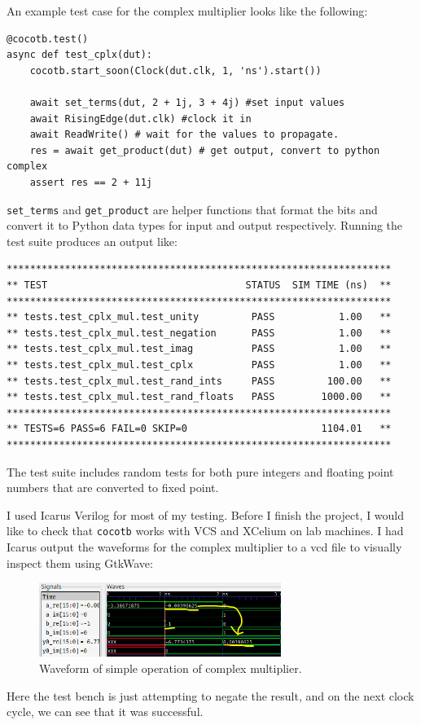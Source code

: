 \documentclass[12pt]{article}
\begin{document}
An example test case for the complex multiplier looks like the following:

\begin{verbatim}
@cocotb.test()
async def test_cplx(dut):
    cocotb.start_soon(Clock(dut.clk, 1, 'ns').start())

    await set_terms(dut, 2 + 1j, 3 + 4j) #set input values
    await RisingEdge(dut.clk) #clock it in
    await ReadWrite() # wait for the values to propagate.
    res = await get_product(dut) # get output, convert to python complex
    assert res == 2 + 11j

\end{verbatim}

\texttt{set\_terms} and \texttt{get\_product} are helper functions that format the
bits and convert it to Python data types for input and output respectively. 
Running the test suite produces an output like:

\begin{verbatim}
******************************************************************
** TEST                                  STATUS  SIM TIME (ns)  **
******************************************************************
** tests.test_cplx_mul.test_unity         PASS           1.00   **
** tests.test_cplx_mul.test_negation      PASS           1.00   **
** tests.test_cplx_mul.test_imag          PASS           1.00   **
** tests.test_cplx_mul.test_cplx          PASS           1.00   **
** tests.test_cplx_mul.test_rand_ints     PASS         100.00   **
** tests.test_cplx_mul.test_rand_floats   PASS        1000.00   **
******************************************************************
** TESTS=6 PASS=6 FAIL=0 SKIP=0                       1104.01   **
******************************************************************
\end{verbatim}
The test suite includes random tests for both pure integers and floating point
numbers that are converted to fixed point. 


I used Icarus Verilog for most of my testing. Before I finish the project,
I would like to check that \texttt{cocotb} works with VCS and XCelium on lab
machines. I had Icarus output the waveforms for the complex multiplier to a vcd
file to visually inspect them using GtkWave:

\begin{figure}[H]
	\centering
	\includegraphics[width=0.7\textwidth]{cplx_mul_waveform.png}
	\caption{Waveform of simple operation of complex multiplier.}
	\label{fig:waveform}
\end{figure}
Here the test bench is just attempting to negate the result, and on the next
clock cycle, we can see that it was successful.
\end{document}
